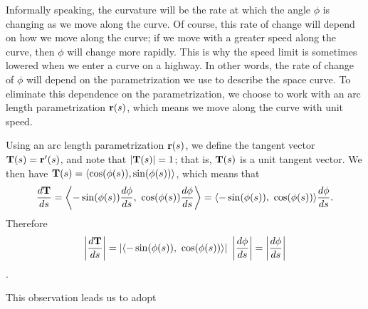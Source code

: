 Informally speaking, the curvature will be
the rate at which the angle $\phi$ is changing as we move along the
curve.  Of course, this rate of change will depend on how we move
along the curve;  if we move with a greater speed along the curve,
then $\phi$ will change more rapidly.  This is why the speed limit is
sometimes lowered when we enter a curve on a highway.  In other words,
the rate of change of $\phi$ will depend on the parametrization we use
to describe the space curve.  To eliminate this dependence on the
parametrization, we choose to work with an arc
length parametrization $\mathbf{r}(s)$, which means we move along the curve
with unit speed. 

Using an arc length parametrization $\mathbf{r}(s)$, we define the tangent vector
$\mathbf{T}(s) = \mathbf{r}'(s)$, and note that $|\mathbf{T}(s)| = 1$;  that is, $\mathbf{T}(s)$ is
a unit tangent vector.  We then have $\mathbf{T}(s) = \langle \cos (\phi(s)),
\sin(\phi(s)) \rangle$, 
which means that
$$\frac{d\mathbf{T}}{ds} = \left\langle -\sin(\phi(s)) \frac{d\phi}{ds}, ~
\cos(\phi(s)) \frac{d\phi}{ds} \right\rangle = 
\langle -\sin(\phi(s)),~
\cos(\phi(s)) \rangle \frac{d\phi}{ds}.
$$
Therefore
$$\left|\frac{d\mathbf{T}}{ds}\right| =  \left|\langle -\sin(\phi(s)),~
\cos(\phi(s)) \rangle\right| ~\left|\frac{d\phi}{ds}\right| = 
\left|\frac{d\phi}{ds}\right|$$.

This observation leads us to adopt 

\vspace*{5pt}
\nin {}
\vspace*{5pt}


